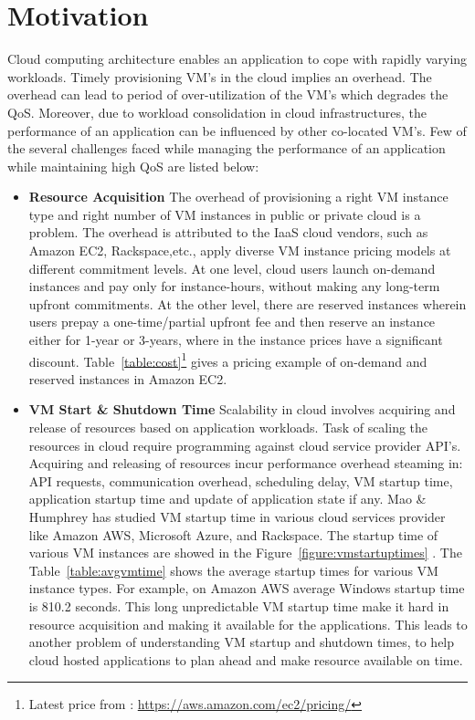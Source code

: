 \section{Motivation}
\label{sec:Motivation}
Cloud computing architecture enables an application to cope with rapidly varying workloads. Timely provisioning VM's in the cloud implies an overhead. The overhead can lead to period of over-utilization of the VM's which degrades the QoS. Moreover, due to workload consolidation in cloud infrastructures, the performance of an application can be influenced by other co-located VM's. Few of the several challenges faced while managing the performance of an application while maintaining high QoS are listed below:
\begin{itemize}
  \item \textbf{Resource Acquisition} The overhead of provisioning a right VM instance type and right number of VM instances in public or private cloud is a problem. The overhead is attributed to the IaaS cloud vendors, such as Amazon EC2\cite{amazon2010amazon}, Rackspace\cite{rackspace2010inc},etc., apply diverse VM instance pricing models at different commitment levels. At one level, cloud users launch on-demand instances and pay only for instance-hours, without making any long-term upfront commitments. At the other level, there are reserved instances wherein users prepay a one-time/partial upfront fee and then reserve an instance either for 1-year or 3-years, where in the instance prices have a significant discount. Table~\ref{table:cost}\footnote{Latest price from : \url{https://aws.amazon.com/ec2/pricing/}} gives a pricing example of on-demand and reserved instances in Amazon EC2.
  \item \textbf{VM Start \& Shutdown Time} Scalability in cloud involves acquiring and release of resources based on application workloads\cite{roy2011efficient}. Task of scaling the resources in cloud require programming against cloud service provider API's. Acquiring and releasing of resources incur performance overhead steaming in: API requests, communication overhead, scheduling delay, VM startup time, application startup time and update of application state if any\cite{roy2011efficient}. Mao \& Humphrey\cite{mao2012performance} has studied VM startup time in various cloud services provider like Amazon AWS, Microsoft Azure, and Rackspace. The startup time of various VM instances are showed in the Figure~\ref{figure:vmstartuptimes} . The Table~\ref{table:avgvmtime} shows the average startup times for various VM instance types. For example, on Amazon AWS average Windows startup time is 810.2 seconds. This long unpredictable VM startup time make it hard in resource acquisition and making it available for the applications. This leads to another problem of understanding VM startup and shutdown times, to help cloud hosted applications to plan ahead and make resource available on time.

\end{itemize}

